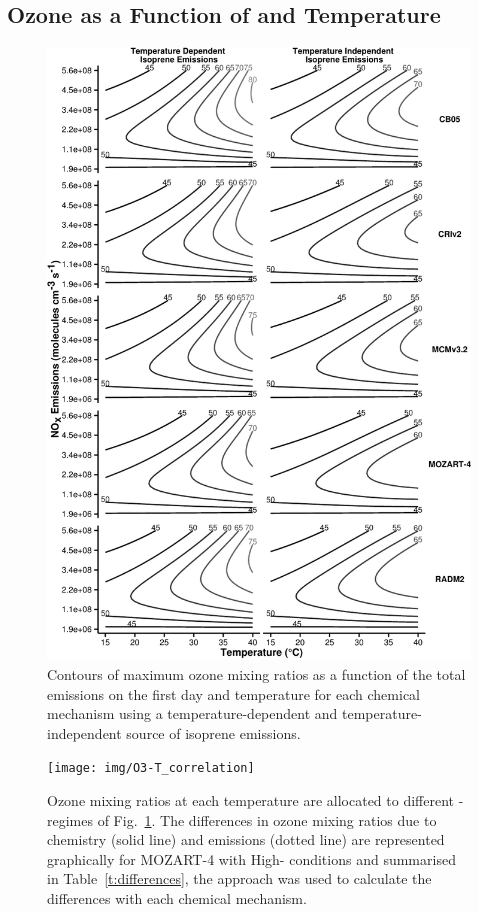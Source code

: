 \subsection[Ozone as a Function of NOx and Temperature]{Ozone as a Function of  and Temperature} \label{ss:r_contours} 
\begin{figure}%
    \centering%
    \caption{Contours of maximum ozone mixing ratios as a function of the total  emissions on the first day and temperature for each chemical mechanism using a temperature-dependent and temperature-independent source of isoprene emissions.}
    \label{f:ozone_contours}%
    \includegraphics[width=\textwidth]{img/O3_comparison}%
\end{figure}

\begin{figure}[t]%
    \centering%
    \caption{Ozone mixing ratios at each temperature are allocated to different -regimes of Fig.~\ref{f:ozone_contours}. The differences in ozone mixing ratios due to chemistry (solid line) and emissions (dotted line) are represented graphically for MOZART-4 with High- conditions and summarised in Table~\ref{t:differences}, the approach was used to calculate the differences with each chemical mechanism.}%
    \label{f:O3-T}%
    \texttt{[image: img/O3-T\_correlation]}%
\end{figure}

